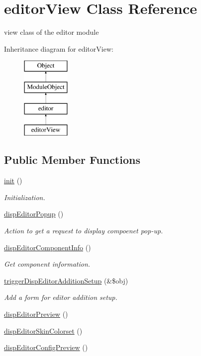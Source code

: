 \hypertarget{classeditorView}{}\section{editor\+View Class Reference}
\label{classeditorView}


view class of the editor module  


Inheritance diagram for editor\+View\+:\begin{figure}[H]
\begin{center}
\leavevmode
\includegraphics[height=4.000000cm]{classeditorView}
\end{center}
\end{figure}
\subsection*{Public Member Functions}
\begin{DoxyCompactItemize}
\item 
\hyperlink{classeditorView_af9e607b227f16e0bf0f1162a968197e9}{init} ()
\begin{DoxyCompactList}\small\item\em Initialization. \end{DoxyCompactList}\item 
\hyperlink{classeditorView_aaa8f777f947452daa94610edc7dc4790}{disp\+Editor\+Popup} ()
\begin{DoxyCompactList}\small\item\em Action to get a request to display compoenet pop-\/up. \end{DoxyCompactList}\item 
\hyperlink{classeditorView_ab303eb3a43e6099484f3c7a090ef3a91}{disp\+Editor\+Component\+Info} ()
\begin{DoxyCompactList}\small\item\em Get component information. \end{DoxyCompactList}\item 
\hyperlink{classeditorView_a64fdf2f32fe2d617ae33162b41058d17}{trigger\+Disp\+Editor\+Addition\+Setup} (\&\$obj)
\begin{DoxyCompactList}\small\item\em Add a form for editor addition setup. \end{DoxyCompactList}\item 
\hyperlink{classeditorView_a2e119bf18da5d6100ca7801967b09716}{disp\+Editor\+Preview} ()
\item 
\hyperlink{classeditorView_a5ef060fe6ef3a5e41a94a8c02cd2860c}{disp\+Editor\+Skin\+Colorset} ()
\item 
\hyperlink{classeditorView_aeaef8bfc0e3897c7dadbc8cffc1e4bd5}{disp\+Editor\+Config\+Preview} ()
\end{DoxyCompactItemize}
